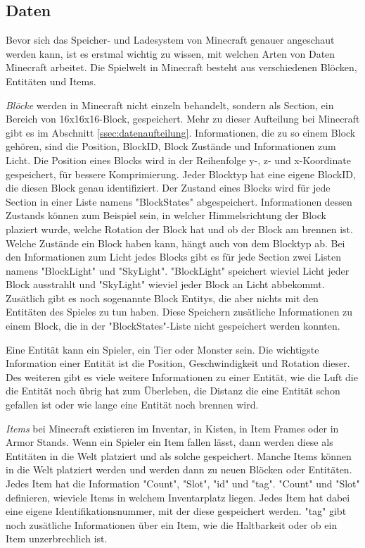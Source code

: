 \subsection{Daten}
Bevor sich das Speicher- und Ladesystem von Minecraft genauer angeschaut werden kann, ist es erstmal wichtig zu wissen, mit welchen Arten von Daten Minecraft arbeitet. Die Spielwelt in Minecraft besteht aus verschiedenen Blöcken, Entitäten und Items. 

\textit{Blöcke} werden in Minecraft nicht einzeln behandelt, sondern als Section, ein Bereich von 16x16x16-Block, gespeichert. Mehr zu dieser Aufteilung bei Minecraft gibt es im Abschnitt \ref{ssec:datenaufteilung}. Informationen, die zu so einem Block gehören, sind die Position, BlockID, Block Zustände und Informationen zum Licht. Die Position eines Blocks wird in der Reihenfolge y-, z- und x-Koordinate gespeichert, für bessere Komprimierung. Jeder Blocktyp hat eine eigene BlockID, die diesen Block genau identifiziert. Der Zustand eines Blocks wird für jede Section in einer Liste namens "BlockStates" abgespeichert. Informationen dessen Zustands können zum Beispiel sein, in welcher Himmelsrichtung der Block plaziert wurde, welche Rotation der Block hat und ob der Block am brennen ist. Welche Zustände ein Block haben kann, hängt auch von dem Blocktyp ab.\cite{minecraftBlockStates} Bei den Informationen zum Licht jedes Blocks gibt es für jede Section zwei Listen namens "BlockLight" und "SkyLight". "BlockLight" speichert wieviel Licht jeder Block ausstrahlt und "SkyLight" wieviel jeder Block an Licht abbekommt. Zusätlich gibt es noch sogenannte Block Entitys, die aber nichts mit den Entitäten des Spieles zu tun haben. Diese Speichern zusätliche Informationen zu einem Block, die in der "BlockStates"-Liste nicht gespeichert werden konnten.\cite{minecraftChunkFormat}

Eine Entität kann ein Spieler, ein Tier oder Monster sein. Die wichtigste Information einer Entität ist die Position, Geschwindigkeit und Rotation dieser. Des weiteren gibt es viele weitere Informationen zu einer Entität, wie die Luft die die Entität noch übrig hat zum Überleben, die Distanz die eine Entität schon gefallen ist oder wie lange eine Entität noch brennen wird.\cite{minecraftEntityFormat}

\textit{Items} bei Minecraft existieren im Inventar, in Kisten, in Item Frames oder in Armor Stands. Wenn ein Spieler ein Item fallen lässt, dann werden diese als Entitäten in die Welt platziert und als solche gespeichert. Manche Items können in die Welt platziert werden und werden dann zu neuen Blöcken oder Entitäten. Jedes Item hat die Information "Count", "Slot", "id" und "tag". "Count" und "Slot" definieren, wieviele Items in welchem Inventarplatz liegen. Jedes Item hat dabei eine eigene Identifikationsnummer, mit der diese gespeichert werden. "tag" gibt noch zusätliche Informationen über ein Item, wie die Haltbarkeit oder ob ein Item unzerbrechlich ist.
\cite{minecraftPlayerdatFormat}
\cite{minecraftItem}

